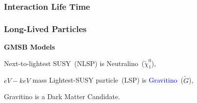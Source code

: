 \documentclass{beamer}
\begin{document}
\begin{frame}
\frametitle{\Huge{Interaction  Life Time}}
\end{frame}



\begin{frame}
\frametitle{\Huge{Long-Lived Particles}}
\begin{minipage}{0.85\paperwidth} 
       \textcolor{UMN@Maroon}{\textbf{\huge{GMSB Models}}}
          \begin{itemize}  
           \Large{  
            \item Next-to-lightest SUSY~(NLSP) is \alert{Neutralino}~($\tilde{\chi}^{0}_{1}$),
            \item $eV-keV$ mass Lightest-SUSY particle~(LSP) is \textcolor{blue}{Gravitino}~($\tilde{G}$),
            \item Gravitino is a Dark Matter Candidate.
           }
          \end{itemize}
   \end{minipage} 
   
 

\end{frame}
\end{document}
